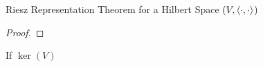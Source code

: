 \documentclass[10pt,compress,xcolor={usenames,dvipsnames},aspectratio=169]{beamer}
\begin{document}
\begin{frame}{Riesz Representation Theorem for a Hilbert Space $(V,\left \langle \cdot, \cdot \right \rangle_{{}})$}
{\begin{proof}
{{}}
\end{proof}}
    
\end{frame}

\begin{frame}{If $\ker(V)$}
\begin{lemma}
    
\end{lemma}
    
\end{frame}
\end{document}
